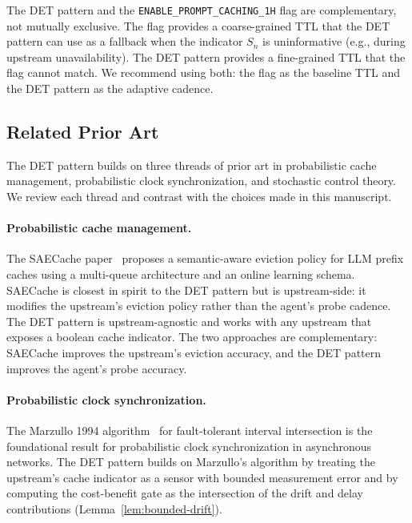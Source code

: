 \begin{remark}
The DET pattern and the
\texttt{ENABLE\_PROMPT\_CACHING\_1H} flag are complementary, not
mutually exclusive. The flag provides a coarse-grained TTL that the
DET pattern can use as a fallback when the indicator $S_n$ is
uninformative (e.g., during upstream unavailability). The DET
pattern provides a fine-grained TTL that the flag cannot match. We
recommend using both: the flag as the baseline TTL and the DET
pattern as the adaptive cadence.
\end{remark}


\subsection{Related Prior Art}

The DET pattern builds on three threads of prior art in
probabilistic cache management, probabilistic clock synchronization,
and stochastic control theory. We review each thread and contrast
with the choices made in this manuscript.

\paragraph{Probabilistic cache management.}
The SAECache paper~\citep{saecache2026} proposes a semantic-aware
eviction policy for LLM prefix caches using a multi-queue architecture
and an online learning schema. SAECache is closest in spirit to
the DET pattern but is upstream-side: it modifies the upstream's
eviction policy rather than the agent's probe cadence. The DET
pattern is upstream-agnostic and works with any upstream that exposes
a boolean cache indicator. The two approaches are complementary:
SAECache improves the upstream's eviction accuracy, and the DET
pattern improves the agent's probe accuracy.

\paragraph{Probabilistic clock synchronization.}
The Marzullo 1994 algorithm~\citep{marzullo1994} for fault-tolerant
interval intersection is the foundational result for probabilistic
clock synchronization in asynchronous networks. The DET pattern
builds on Marzullo's algorithm by treating the upstream's cache
indicator as a sensor with bounded measurement error and by
computing the cost-benefit gate as the intersection of the drift
and delay contributions (Lemma~\ref{lem:bounded-drift}).

